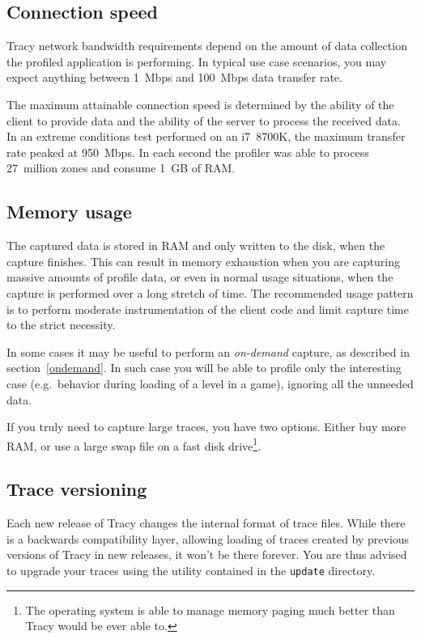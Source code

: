 \documentclass[hidelinks,titlepage,a4paper]{article}
\begin{document}
\subsection{Connection speed}

Tracy network bandwidth requirements depend on the amount of data collection the profiled application is performing. In typical use case scenarios, you may expect anything between 1~Mbps and 100~Mbps data transfer rate.

The maximum attainable connection speed is determined by the ability of the client to provide data and the ability of the server to process the received data. In an extreme conditions test performed on an i7~8700K, the maximum transfer rate peaked at 950~Mbps. In each second the profiler was able to process 27~million zones and consume 1~GB of RAM.

\subsection{Memory usage}

The captured data is stored in RAM and only written to the disk, when the capture finishes. This can result in memory exhaustion when you are capturing massive amounts of profile data, or even in normal usage situations, when the capture is performed over a long stretch of time. The recommended usage pattern is to perform moderate instrumentation of the client code and limit capture time to the strict necessity.

In some cases it may be useful to perform an \emph{on-demand} capture, as described in section~\ref{ondemand}. In such case you will be able to profile only the interesting case (e.g.\ behavior during loading of a level in a game), ignoring all the unneeded data.

If you truly need to capture large traces, you have two options. Either buy more RAM, or use a large swap file on a fast disk drive\footnote{The operating system is able to manage memory paging much better than Tracy would be ever able to.}.

\subsection{Trace versioning}

Each new release of Tracy changes the internal format of trace files. While there is a backwards compatibility layer, allowing loading of traces created by previous versions of Tracy in new releases, it won't be there forever. You are thus advised to upgrade your traces using the utility contained in the \texttt{update} directory.
\end{document}
